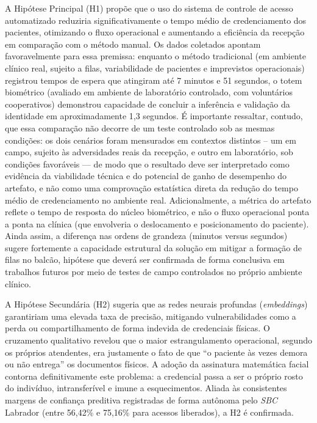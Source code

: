 A Hipótese Principal (H1) propõe que o uso do sistema de controle de acesso automatizado reduziria significativamente o tempo médio de credenciamento dos pacientes, otimizando o fluxo operacional e aumentando a eficiência da recepção em comparação com o método manual. Os dados coletados apontam favoravelmente para essa premissa: enquanto o método tradicional (em ambiente clínico real, sujeito a filas, variabilidade de pacientes e imprevistos operacionais) registrou tempos de espera que atingiram até 7 minutos e 51 segundos, o totem biométrico (avaliado em ambiente de laboratório controlado, com voluntários cooperativos) demonstrou capacidade de concluir a inferência e validação da identidade em aproximadamente 1,3 segundos. É importante ressaltar, contudo, que essa comparação não decorre de um teste controlado sob as mesmas condições: os dois cenários foram mensurados em contextos distintos -- um em campo, sujeito às adversidades reais da recepção, e outro em laboratório, sob condições favoráveis — de modo que o resultado deve ser interpretado como evidência da viabilidade técnica e do potencial de ganho de desempenho do artefato, e não como uma comprovação estatística direta da redução do tempo médio de credenciamento no ambiente real. Adicionalmente, a métrica do artefato reflete o tempo de resposta do núcleo biométrico, e não o fluxo operacional ponta a ponta na clínica (que envolveria o deslocamento e posicionamento do paciente). Ainda assim, a diferença nas ordens de grandeza (minutos versus segundos) sugere fortemente a capacidade estrutural da solução em mitigar a formação de filas no balcão, hipótese que deverá ser confirmada de forma conclusiva em trabalhos futuros por meio de testes de campo controlados no próprio ambiente clínico.

A Hipótese Secundária (H2) sugeria que as redes neurais profundas (\textit{embeddings}) garantiriam uma elevada taxa de precisão, mitigando vulnerabilidades como a perda ou compartilhamento de forma indevida de credenciais físicas. O cruzamento qualitativo revelou que o maior estrangulamento operacional, segundo os próprios atendentes, era justamente o fato de que ``o paciente às vezes demora ou não entrega'' os documentos físicos. A adoção da assinatura matemática facial contorna definitivamente este problema: a credencial passa a ser o próprio rosto do indivíduo, intransferível e imune a esquecimentos. Aliada às consistentes margens de confiança preditiva registradas de forma autônoma pelo \textit{SBC} Labrador (entre 56,42\% e 75,16\% para acessos liberados), a H2 é confirmada. 


